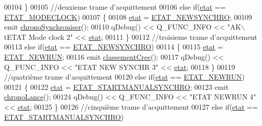 \begin{DoxyCode}
00104             \}
00105             \textcolor{comment}{//deuxieme trame d'acquittement}
00106             \textcolor{keywordflow}{else} \textcolor{keywordflow}{if}(\hyperlink{class_chrono_ad82d4f2a230290aa9695f12bf5ac02e8}{etat} == \hyperlink{chrono_8h_ac7f40e9c99ad9f32b52bbe642c29fa35}{ETAT\_MODECLOCK})
00107             \{
00108                 \hyperlink{class_chrono_ad82d4f2a230290aa9695f12bf5ac02e8}{etat} = \hyperlink{chrono_8h_ab4e7883be172f7dac0123a67e9c6c655}{ETAT\_NEWSYNCHRO};
00109                 emit \hyperlink{class_chrono_a4ae8a6eb8da3f43eb15392b08f391237}{chronoSynchroniser}();
00110                 qDebug() << Q\_FUNC\_INFO << \textcolor{stringliteral}{"AK\(\backslash\)tETAT Mode clock 2"} << \hyperlink{class_chrono_ad82d4f2a230290aa9695f12bf5ac02e8}{etat};
00111             \}
00112             \textcolor{comment}{//troisieme trame d'acquittement}
00113             \textcolor{keywordflow}{else} \textcolor{keywordflow}{if}(\hyperlink{class_chrono_ad82d4f2a230290aa9695f12bf5ac02e8}{etat} == \hyperlink{chrono_8h_ab4e7883be172f7dac0123a67e9c6c655}{ETAT\_NEWSYNCHRO})
00114             \{
00115                 \hyperlink{class_chrono_ad82d4f2a230290aa9695f12bf5ac02e8}{etat} = \hyperlink{chrono_8h_a3870f0e4dd2af74ba5c110e419d65d99}{ETAT\_NEWRUN};
00116                 emit \hyperlink{class_chrono_aea06e35eac092428e821a07a5e2df64c}{classementCree}();
00117                 qDebug() << Q\_FUNC\_INFO << \textcolor{stringliteral}{"ETAT NEW SYNCHR 3"} << \hyperlink{class_chrono_ad82d4f2a230290aa9695f12bf5ac02e8}{etat};
00118             \}
00119             \textcolor{comment}{//quatrième trame d'acquittement}
00120             \textcolor{keywordflow}{else} \textcolor{keywordflow}{if}(\hyperlink{class_chrono_ad82d4f2a230290aa9695f12bf5ac02e8}{etat} == \hyperlink{chrono_8h_a3870f0e4dd2af74ba5c110e419d65d99}{ETAT\_NEWRUN})
00121             \{
00122                 \hyperlink{class_chrono_ad82d4f2a230290aa9695f12bf5ac02e8}{etat} = \hyperlink{chrono_8h_ab6827e7b3f5ba7079e57df316b490544}{ETAT\_STARTMANUALSYNCHRO};
00123                 emit \hyperlink{class_chrono_a590290b81a290717bfe1b87f1c605181}{chronoLance}();
00124                 qDebug() << Q\_FUNC\_INFO << \textcolor{stringliteral}{"ETAT NEWRUN 4"} << \hyperlink{class_chrono_ad82d4f2a230290aa9695f12bf5ac02e8}{etat};
00125             \}
00126             \textcolor{comment}{//cinquième trame d'acquittement}
00127             \textcolor{keywordflow}{else} \textcolor{keywordflow}{if}(\hyperlink{class_chrono_ad82d4f2a230290aa9695f12bf5ac02e8}{etat} == \hyperlink{chrono_8h_ab6827e7b3f5ba7079e57df316b490544}{ETAT\_STARTMANUALSYNCHRO})

\end{DoxyCode}
